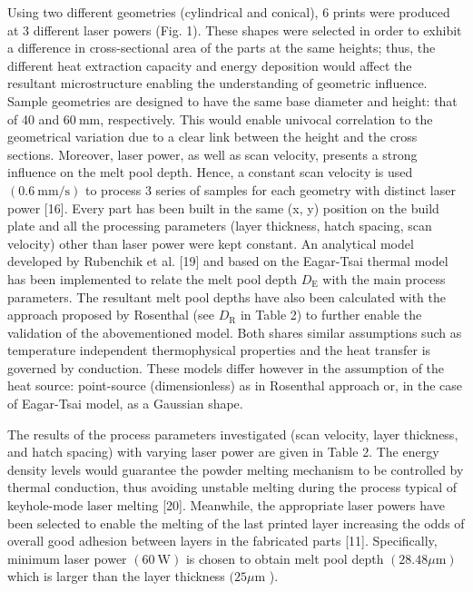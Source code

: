 \documentclass[10pt]{article}
\begin{document}
Using two different geometries (cylindrical and conical), 6 prints were produced at 3 different laser powers (Fig. 1). These shapes were selected in order to exhibit a difference in cross-sectional area of the parts at the same heights; thus, the different heat extraction capacity and energy deposition would affect the resultant microstructure enabling the understanding of geometric influence. Sample geometries are designed to have the same base diameter and height: that of 40 and $60 \mathrm{~mm}$, respectively. This would enable univocal correlation to the geometrical variation due to a clear link between the height and the cross sections. Moreover, laser power, as well as scan velocity, presents a strong influence on the melt pool depth. Hence, a constant scan velocity is used $(0.6 \mathrm{~mm} / \mathrm{s})$ to process 3 series of samples for each geometry with distinct laser power [16]. Every part has been built in the same (x, y) position on the build plate and all the processing parameters (layer thickness, hatch spacing, scan velocity) other than laser power were kept constant. An analytical model developed by Rubenchik et al. [19] and based on the Eagar-Tsai thermal model has been implemented to relate the melt pool depth $D_{\mathrm{E}}$ with the main process parameters. The resultant melt pool depths have also been calculated with the approach proposed by Rosenthal (see $D_{\mathrm{R}}$ in Table 2) to further enable the validation of the abovementioned model. Both shares similar assumptions such as temperature independent thermophysical properties and the heat transfer is governed by conduction. These models differ however in the assumption of the heat source: point-source (dimensionless) as in Rosenthal approach or, in the case of Eagar-Tsai model, as a Gaussian shape.

The results of the process parameters investigated (scan velocity, layer thickness, and hatch spacing) with varying laser power are given in Table 2. The energy density levels would guarantee the powder melting mechanism to be controlled by thermal conduction, thus avoiding unstable melting during the process typical of keyhole-mode laser melting [20]. Meanwhile, the appropriate laser powers have been selected to enable the melting of the last printed layer increasing the odds of overall good adhesion between layers in the fabricated parts [11]. Specifically, minimum laser power $(60 \mathrm{~W})$ is chosen to obtain melt pool depth $(28.48 \mu \mathrm{m})$ which is larger than the layer thickness $(25 \mu \mathrm{m}$ ).
\end{document}
